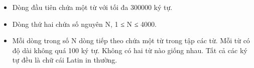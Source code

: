 \begin{itemize}
	\item     Dòng đầu tiên chứa một từ với tối đa 300000 ký tự.   
	\item     Dòng thứ hai chứa số nguyên N, 1 ≤ N ≤ 4000.   
	\item     Mỗi dòng trong số N dòng tiếp theo chứa một từ trong tập các từ. Mỗi từ có độ dài không quá 100 ký tự. Không có hai từ nào giống nhau. Tất cả   các ký tự đều là chữ cái Latin in thường.   
\end{itemize}